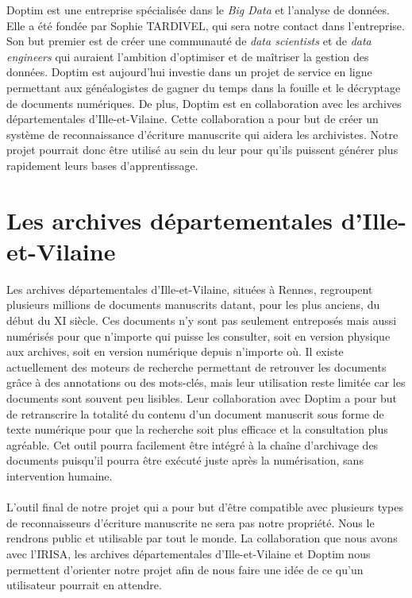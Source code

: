 Doptim est une entreprise spécialisée dans le \textit{Big Data} et l’analyse de données.
Elle a été fondée par Sophie TARDIVEL, qui sera notre contact dans l’entreprise.
Son but premier est de créer une communauté de \textit{data scientists} et de
\textit{data engineers} qui auraient l’ambition d’optimiser et de maîtriser la gestion
des données. Doptim est aujourd’hui investie dans un projet de service en ligne permettant
aux généalogistes de gagner du temps dans la fouille et le décryptage de documents numériques.
De plus, Doptim est en collaboration avec les archives départementales d’Ille-et-Vilaine.
Cette collaboration a pour but de créer un système de reconnaissance d’écriture manuscrite qui
aidera les archivistes. Notre projet pourrait donc être utilisé au sein du leur pour qu’ils
puissent générer plus rapidement leurs bases d’apprentissage.

\section{Les archives départementales d’Ille-et-Vilaine}

Les archives départementales d’Ille-et-Vilaine, situées à Rennes, regroupent plusieurs
millions de documents manuscrits datant, pour les plus anciens, du début du XI siècle.
Ces documents n’y sont pas seulement entreposés mais aussi numérisés pour que n’importe qui
puisse les consulter, soit en version physique aux archives, soit en version numérique
depuis n’importe où. Il existe actuellement des moteurs de recherche permettant de retrouver
les documents grâce à des annotations ou des mots-clés, mais leur utilisation reste limitée
car les documents sont souvent peu lisibles. Leur collaboration avec Doptim a pour but de
retranscrire la totalité du contenu d’un document manuscrit sous forme de texte numérique
pour que la recherche soit plus efficace et la consultation plus agréable. Cet outil pourra
facilement être intégré à la chaîne d’archivage des documents puisqu’il pourra être exécuté
juste après la numérisation, sans intervention humaine.

\paragraph{}
L’outil final de notre projet qui a pour but d’être compatible avec plusieurs types de
reconnaisseurs d’écriture manuscrite ne sera pas notre propriété. Nous le rendrons public et
utilisable par tout le monde. La collaboration que nous avons avec l’IRISA, les archives
départementales d’Ille-et-Vilaine et Doptim nous permettent d’orienter notre projet afin de
nous faire une idée de ce qu’un utilisateur pourrait en attendre.